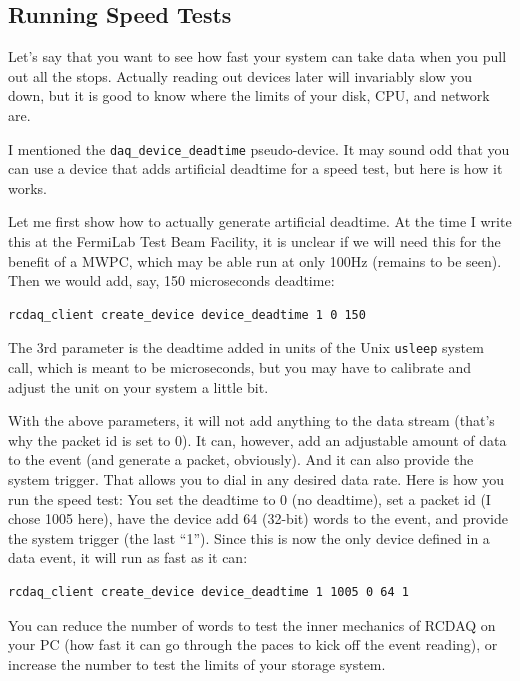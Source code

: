 \documentclass{article}[11pt]
\begin{document}
\subsection{Running Speed Tests}
\label{speedtests}
Let's say that you want to see how fast your system can take data when
you pull out all the stops. Actually reading out devices later will
invariably slow you down, but it is good to know where the limits of
your disk, CPU, and network are.

I mentioned the \verb|daq_device_deadtime| pseudo-device. It may sound
odd that you can use a device that adds artificial deadtime for a
speed test, but here is how it works.

Let me first show how to actually generate artificial deadtime. At the
time I write this at the FermiLab Test Beam Facility, it is unclear if
we will need this for the benefit of a MWPC, which may be able run at
only 100Hz (remains to be seen). Then we would add, say, 150 microseconds
deadtime:

\begin{verbatim}
rcdaq_client create_device device_deadtime 1 0 150
\end{verbatim}

The 3rd parameter is the deadtime added in units of the Unix \verb|usleep|
system call, which is meant to be microseconds, but you may have to calibrate and 
adjust the unit on your system a little bit.  

With the above parameters, it will not add anything to the data stream
(that's why the packet id is set to 0). It can, however, add an
adjustable amount of data to the event (and generate a packet,
obviously). And it can also provide the system trigger. That allows
you to dial in any desired data rate. Here is how you run the speed
test: You set the deadtime to 0 (no deadtime), set a packet id (I
chose 1005 here), have the device add 64 (32-bit) words to the event,
and provide the system trigger (the last ``1''). Since this is now the
only device defined in a data event, it will run as fast as it can:

\begin{verbatim}
rcdaq_client create_device device_deadtime 1 1005 0 64 1
\end{verbatim}

You can reduce the number of words to test the inner mechanics of
RCDAQ on your PC (how fast it can go through the paces to kick off the
event reading), or increase the number to test the limits of your
storage system. 
\end{document}

